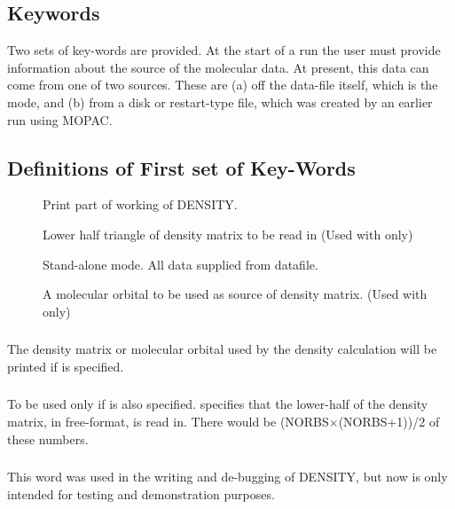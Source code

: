 \subsection{Keywords}
Two sets of key-words are provided. At the start of a run the user must provide
information about the source of the molecular data. At present, this data can
come from one of two sources. These are (a) off the data-file itself, which is
the  mode, and (b) from a disk or restart-type file, which was
created by an earlier run using MOPAC.

\subsection{Definitions of First set of Key-Words}
\begin{description}
\item[] Print part of working of DENSITY.
\item[] Lower half triangle of density matrix to be read in (Used
with  only)
\item[] Stand-alone  mode. All data supplied from datafile.
\item[] A molecular orbital to be used as source of density matrix.
(Used with  only)
\end{description}

\subsubsection*{}
The density matrix or molecular orbital used by the density calculation will be
printed if  is specified.

\subsubsection*{}
To be used only if  is also specified.  specifies that
the lower-half of the density matrix, in free-format, is read in. There would
be (NORBS$\times$(NORBS+1))/2 of these numbers.

\subsubsection*{}
This word was used in the writing and de-bugging of DENSITY,  but now is only
intended for testing and demonstration purposes.

